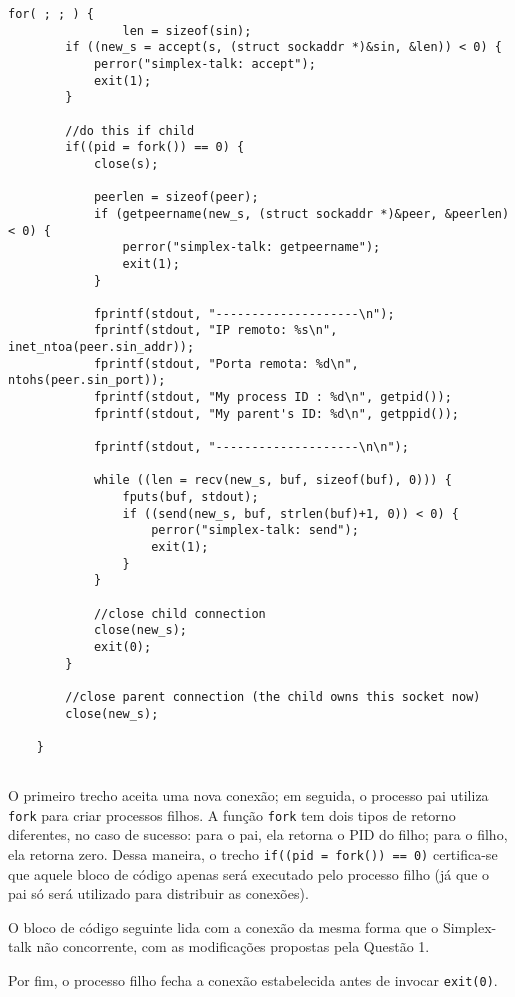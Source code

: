 \documentclass[a4paper,10pt]{article}
\begin{document}
\begin{lstlisting}
for( ; ; ) {
                len = sizeof(sin);
        if ((new_s = accept(s, (struct sockaddr *)&sin, &len)) < 0) {
            perror("simplex-talk: accept");
            exit(1);
        }

        //do this if child
        if((pid = fork()) == 0) {
            close(s);

            peerlen = sizeof(peer);
            if (getpeername(new_s, (struct sockaddr *)&peer, &peerlen) < 0) {
                perror("simplex-talk: getpeername");
                exit(1);
            }

            fprintf(stdout, "--------------------\n");
            fprintf(stdout, "IP remoto: %s\n", inet_ntoa(peer.sin_addr));
            fprintf(stdout, "Porta remota: %d\n", ntohs(peer.sin_port));
            fprintf(stdout, "My process ID : %d\n", getpid());
            fprintf(stdout, "My parent's ID: %d\n", getppid());

            fprintf(stdout, "--------------------\n\n");

            while ((len = recv(new_s, buf, sizeof(buf), 0))) {
                fputs(buf, stdout);
                if ((send(new_s, buf, strlen(buf)+1, 0)) < 0) {
                    perror("simplex-talk: send");
                    exit(1);
                }
            }

            //close child connection
            close(new_s);
            exit(0);
        }

        //close parent connection (the child owns this socket now)
        close(new_s);

    }
    
\end{lstlisting}

O primeiro trecho aceita uma nova conexão; em seguida, o processo pai utiliza {\tt fork} para criar processos filhos. A função {\tt fork} tem dois tipos de retorno diferentes, no caso de sucesso: para o pai, ela retorna o PID do filho; para o filho, ela retorna zero. Dessa maneira, o trecho {\tt if((pid = fork()) == 0)} certifica-se que aquele bloco de código apenas será executado pelo processo filho (já que o pai só será utilizado para distribuir as conexões).

O bloco de código seguinte lida com a conexão da mesma forma que o Simplex-talk não concorrente, com as modificações propostas pela Questão 1.

Por fim, o processo filho fecha a conexão estabelecida antes de invocar {\tt exit(0)}.
\end{document}
